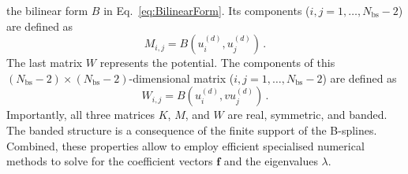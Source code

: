 \documentclass[fontsize=12pt,
               twoside=false,
               BCOR=0mm,
               DIV=14,
               overfullrule=false, %
               toc=bibliography,
               headinclude=true,
               footinclude=false]{scrartcl}
\numberwithin{equation}{section}
\begin{document}
    the bilinear form $B$ in Eq.~\eqref{eq:BilinearForm}. Its components
    ($i,j=1,\dots,N_\mathrm{bs}-2$) are defined as
    \begin{equation}
        M_{i,j}
        =
        B(u^{(d)}_i,u^{(d)}_j)
    \,.
    \end{equation}
    The last matrix $W$ represents the potential. The components of this
    $(N_\mathrm{bs}-2)\times(N_\mathrm{bs}-2)$-dimensional matrix
    ($i,j=1,\dots,N_\mathrm{bs}-2$) are defined as
    \begin{equation}
        W_{i,j}
        =
        B(u^{(d)}_i,vu^{(d)}_j)
    \,.
    \end{equation}
    Importantly, all three matrices $K$, $M$, and $W$ are real, symmetric, and
    banded. The banded structure is a consequence of the finite support of the
    B-splines. Combined, these properties allow to employ efficient specialised
    numerical methods to solve for the coefficient vectors $\bm{f}$ and the
    eigenvalues $\lambda$.
\end{document}
